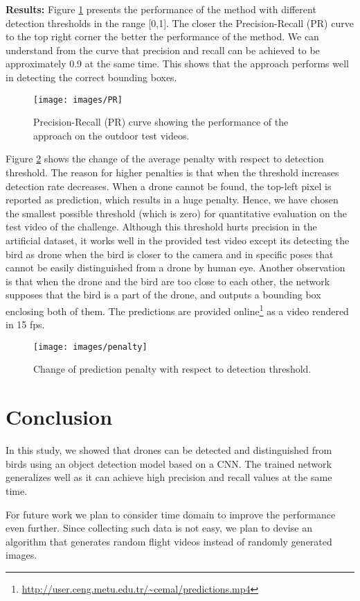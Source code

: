 \documentclass[10pt,twocolumn,letterpaper]{article}
\begin{document}
\textbf{Results:} Figure \ref{prcurve} presents the performance of the method with different detection thresholds in the range [0,1]. The closer the Precision-Recall (PR) curve to the top right corner the better the performance of the method. We can understand from the curve that precision and recall can be achieved to be approximately 0.9 at the same time. This shows that the approach performs well in detecting the correct bounding boxes.
\begin{figure}
\centering
	\texttt{[image: images/PR]}
    \caption{Precision-Recall (PR) curve showing the performance of the approach on the outdoor test videos.}
    \label{prcurve}
\end{figure}\par
Figure \ref{penalty} shows the change of the average penalty with respect to detection threshold. The reason for higher penalties is that when the threshold increases detection rate decreases.  When a drone cannot be found, the top-left pixel is reported as prediction, which results in a huge penalty. Hence, we have chosen the smallest possible threshold (which is zero) for quantitative evaluation on the test video of the challenge. Although this threshold hurts precision in the artificial dataset, it works well in the provided test video except its detecting the bird as drone when the bird is closer to the camera and in specific poses that cannot be easily distinguished from a drone by human eye. Another observation is that when the drone and the bird are too close to each other, the network supposes that the bird is a part of the drone, and outputs a bounding box enclosing both of them. The predictions are provided online\footnote{\url{http://user.ceng.metu.edu.tr/~cemal/predictions.mp4}} as a video rendered in 15 fps.
\begin{figure}
\centering
	\texttt{[image: images/penalty]}
    \caption{Change of prediction penalty with respect to detection threshold.}
    \label{penalty}
\end{figure}
\section{Conclusion}
In this study, we showed that drones can be detected and distinguished from birds using an object detection model based on a CNN. The trained network generalizes well as it can achieve high precision and recall values at the same time. 
\par
For future work we plan to consider time domain to improve the performance even further. Since collecting such data is not easy, we plan to devise an algorithm that generates random flight videos instead of randomly generated images.

{\small
%
%

}


\end{document}
